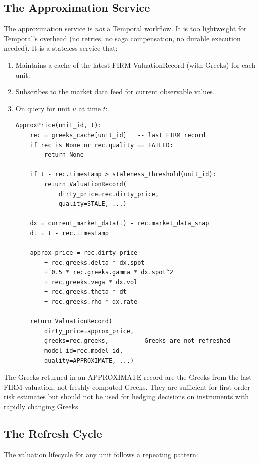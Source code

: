 \documentclass[11pt,a4paper]{article}
\begin{document}
\subsection{The Approximation Service}

The approximation service is \emph{not} a Temporal workflow.  It is too lightweight for Temporal's overhead (no retries, no saga compensation, no durable execution needed).  It is a stateless service that:

\begin{enumerate}[nosep]
\item Maintains a cache of the latest FIRM ValuationRecord (with Greeks) for each unit.
\item Subscribes to the market data feed for current observable values.
\item On query for unit $u$ at time $t$:
\begin{lstlisting}
ApproxPrice(unit_id, t):
    rec = greeks_cache[unit_id]   -- last FIRM record
    if rec is None or rec.quality == FAILED:
        return None

    if t - rec.timestamp > staleness_threshold(unit_id):
        return ValuationRecord(
            dirty_price=rec.dirty_price,
            quality=STALE, ...)

    dx = current_market_data(t) - rec.market_data_snap
    dt = t - rec.timestamp

    approx_price = rec.dirty_price
        + rec.greeks.delta * dx.spot
        + 0.5 * rec.greeks.gamma * dx.spot^2
        + rec.greeks.vega * dx.vol
        + rec.greeks.theta * dt
        + rec.greeks.rho * dx.rate

    return ValuationRecord(
        dirty_price=approx_price,
        greeks=rec.greeks,       -- Greeks are not refreshed
        model_id=rec.model_id,
        quality=APPROXIMATE, ...)
\end{lstlisting}
\end{enumerate}

\noindent The Greeks returned in an APPROXIMATE record are the Greeks from the last FIRM valuation, not freshly computed Greeks.  They are sufficient for first-order risk estimates but should not be used for hedging decisions on instruments with rapidly changing Greeks.

\subsection{The Refresh Cycle}

The valuation lifecycle for any unit follows a repeating pattern:
\end{document}
